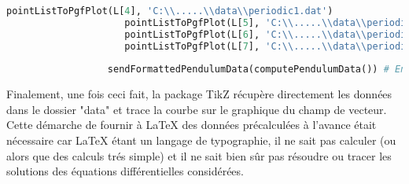 \documentclass{report}
\begin{document}
\begin{center}
\begin{lstlisting}[language=Python, caption=Méthode d'Euler générale]
                     pointListToPgfPlot(L[4], 'C:\\.....\\data\\periodic1.dat')
                     pointListToPgfPlot(L[5], 'C:\\.....\\data\\periodic2.dat')
                     pointListToPgfPlot(L[6], 'C:\\.....\\data\\periodic3.dat')
                     pointListToPgfPlot(L[7], 'C:\\.....\\data\\periodic4.dat')
                  
                  sendFormattedPendulumData(computePendulumData()) # Envoie les donnees
            \end{lstlisting}
         \end{center}
         Finalement, une fois ceci fait, la package TikZ récupère directement les données dans le dossier "data" et trace la courbe sur le graphique du champ de vecteur. Cette démarche de fournir à LaTeX des données précalculées à l'avance était nécessaire car LaTeX étant un langage de typographie, il ne sait pas calculer (ou alors que des calculs trés simple) et il ne sait bien sûr pas résoudre ou tracer les solutions des équations différentielles considérées.
\end{document}

